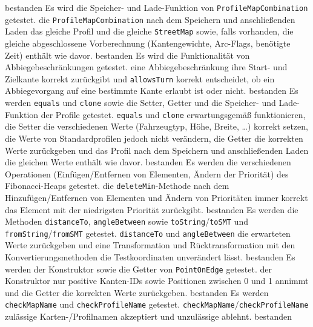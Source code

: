 \documentclass[a4paper, 11pt]{article}
\newcommand{\code}[1]{\texttt{#1}}
\begin{document}
\begin{itemize}
     {bestanden}
     {Es wird die Speicher- und Lade-Funktion von \code{Pro\-file\-Map\-Com\-bi\-na\-tion} getestet.}
     {die \code{ProfileMapCombination} nach dem Speichern und anschließenden Laden das gleiche Profil und die gleiche \code{StreetMap} sowie, falls vorhanden, die gleiche abgeschlossene Vorberechnung (Kantengewichte, Arc-Flags, benötigte Zeit) enthält wie davor.}
     {bestanden}
     {Es wird die Funktionalität von Abbiegebeschränkungen getestet.}
     {eine Abbiegebeschränkung ihre Start- und Zielkante korrekt zurückgibt und \code{allowsTurn} korrekt entscheidet, ob ein Abbiegevorgang auf eine bestimmte Kante erlaubt ist oder nicht.}
     {bestanden}
     {Es werden \code{equals} und \code{clone} sowie die Setter, Getter und die Speicher- und Lade-Funktion der Profile getestet.}
     {\code{equals} und \code{clone} erwartungsgemäß funktionieren, die Setter die verschiedenen Werte (Fahrzeugtyp, Höhe, Breite, \dots) korrekt setzen, die Werte von Standardprofilen jedoch nicht verändern, die Getter die korrekten Werte zurückgeben und das Profil nach dem Speichern und anschließenden Laden die gleichen Werte enthält wie davor.}
     {bestanden}
     {Es werden die verschiedenen Operationen (Einfügen/Entfernen von Elementen, Ändern der Priorität) des Fibonacci-Heaps getestet.}
     {die \code{deleteMin}-Methode nach dem Hinzufügen/Entfernen von Elementen und Ändern von Prioritäten immer korrekt das Element mit der niedrigsten Priorität zurückgibt.}
     {bestanden}
     {Es werden die Methoden \code{distanceTo}, \code{angleBetween} sowie \code{toString}/\code{toSMT} und \code{fromString}/\code{fromSMT} getestet.}
     {\code{distanceTo} und \code{angleBetween} die erwarteten Werte zurückgeben und eine Transformation und Rücktransformation mit den Konvertierungsmethoden die Testkoordinaten unverändert lässt.}
     {bestanden}
     {Es werden der Konstruktor sowie die Getter von \code{PointOnEdge} getestet.}
     {der Konstruktor nur positive Kanten-IDs sowie Positionen zwischen 0 und 1 annimmt und die Getter die korrekten Werte zurückgeben.}
     {bestanden}
     {Es werden \code{checkMapName} und \code{checkProfileName} getestet.}
     {\code{checkMapName}/\code{checkProfileName} zulässige \mbox{Karten-/}\hspace{0pt}Profilnamen akzeptiert und unzulässige ablehnt.}
     {bestanden}
\end{itemize}
\end{document}
